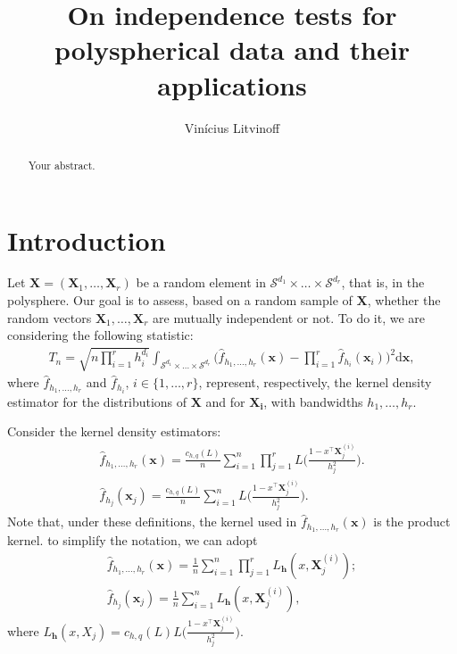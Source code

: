 \documentclass{article}
\title{On independence tests for polyspherical data and
their applications}
\author{Vinícius Litvinoff}
\begin{document}
\maketitle

\begin{abstract}
Your abstract.
\end{abstract}

\section{Introduction}

Let $\mathbf{X} = (\mathbf{X}_1, \dots, \mathbf{X}_r)$ be a random element in $\mathcal{S}^{d_1} \times \dots \times \mathcal{S}^{d_r}$, that is, in the polysphere. Our goal is to assess, based on a random sample of $\mathbf{X}$, whether the random vectors $\mathbf{X}_1, \dots, \mathbf{X}_r$ are mutually independent or not. To do it, we are considering the following statistic:
\begin{align}
    T_n = \sqrt{n \prod_{i = 1}^{r} h_i^{d_i}} \int_{\mathcal{S}^{d_1} \times \dots \times \mathcal{S}^{d_r}} \Big( \hat{f}_{h_1, \dots, h_r}(\mathbf{x}) - \prod_{i = 1}^{r} \hat{f}_{h_i}(\mathbf{x}_i) \Big)^2 \mathrm{d} \mathbf{x},
\end{align}
where $\hat{f}_{h_1, \dots, h_r}$ and $\hat{f}_{h_i}$, $i \in \{ 1, \dots, r \}$, represent, respectively, the kernel density estimator for the distributions of $\mathbf{X}$ and for $\mathbf{X_i}$, with bandwidths $h_1, \dots, h_r$.

Consider the kernel density estimators:
\begin{align}
    \hat{f}_{h_1, \dots, h_r}(\mathbf{x}) = \frac{c_{h,q}(L)}{n} \sum_{i=1}^{n} \prod_{j=1}^{r} L \Bigg( \frac{1 - x^{\top} \mathbf{X}_j^{(i)}}{h_j^2} \Bigg). \\
    \hat{f}_{h_j}(\mathbf{x}_j) = \frac{c_{h,q}(L)}{n} \sum_{i=1}^{n} L \Bigg( \frac{1 - x^{\top} \mathbf{X}_j^{(i)}}{h_j^2} \Bigg).
\end{align}
Note that, under these definitions, the kernel used in $ \hat{f}_{h_1, \dots, h_r}(\mathbf{x})$ is the product kernel. to simplify the notation, we can adopt
\begin{align}
    \hat{f}_{h_1, \dots, h_r}(\mathbf{x}) = \frac{1}{n} \sum_{i=1}^{n} \prod_{j=1}^{r} L_{\mathbf{h}} (x,\mathbf{X}_j^{(i)}); \\
    \hat{f}_{h_j}(\mathbf{x}_j) = \frac{1}{n} \sum_{i=1}^{n} L_{\mathbf{h}} (x,\mathbf{X}_j^{(i)}),
\end{align}
where $L_{\mathbf{h}} (x,X_j) = c_{h,q}(L) L \Big( \frac{1 - x^{\top} \mathbf{X}_j^{(i)}}{h_j^2} \Big)$.
\end{document}
